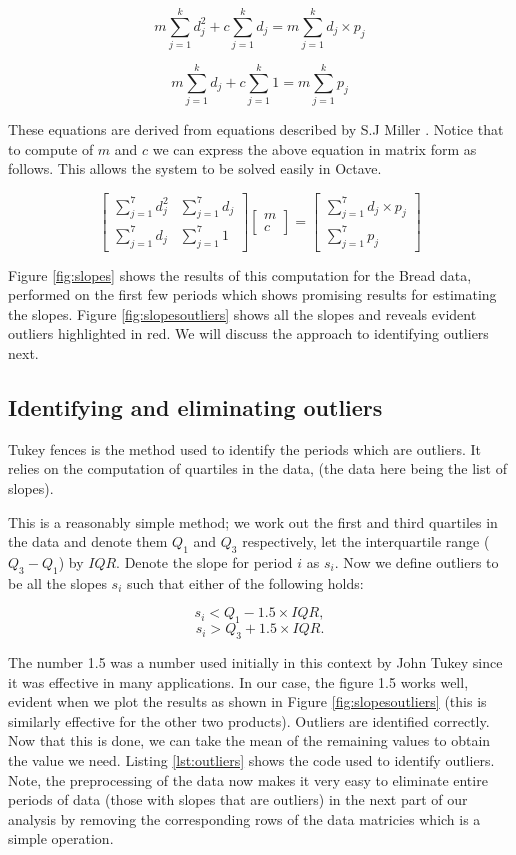 $$
m\sum_{j = 1}^{k} d_{j}^2 + c\sum_{j = 1}^{k} d_{j} = m\sum_{j = 1}^{k} d_{j} \times p_{j}
$$

$$
m\sum_{j = 1}^{k} d_{j} + c\sum_{j = 1}^{k} 1 = m\sum_{j = 1}^{k}  p_{j}
$$

These equations are derived from equations described by S.J Miller \cite{squares}. Notice that to compute of $m$ and $c$ we can express the above equation in matrix form as follows. This allows the system to be solved easily in Octave.

\[
\begin{bmatrix}
\sum_{j = 1}^{7} d_{j}^2 & \sum_{j = 1}^{7} d_{j} \\
\sum_{j = 1}^{7} d_{j} & \sum_{j = 1}^{7} 1
\end{bmatrix}
\begin{bmatrix}
m\\
c
\end{bmatrix}
=
\begin{bmatrix}
\sum_{j = 1}^{7} d_{j} \times p_{j}\\
\sum_{j = 1}^{7}  p_{j}
\end{bmatrix}
\]

Figure \ref{fig:slopes} shows the results of this computation for the Bread data, performed on the first few periods which shows promising results for estimating the slopes. Figure \ref{fig:slopesoutliers} shows all the slopes and reveals evident outliers highlighted in red. We will discuss the approach to identifying outliers next.

\subsection{Identifying and eliminating outliers}

Tukey fences \cite{tukey} is the method used to identify the periods which are outliers.  It relies on the computation of quartiles in the data, (the data here being the list of slopes).

This is a reasonably simple method; we work out the first and third quartiles in the data and denote them $Q_1$ and $Q_3$ respectively, let the interquartile range ($Q_3 - Q_1$) by $IQR$. Denote the slope for period $i$ as $s_i$. Now we define outliers to be all the slopes $s_i$ such that either of the following holds:

$$
s_i < Q_1 - 1.5 \times IQR,
$$
$$
s_i > Q_3 + 1.5 \times IQR .
$$

The number 1.5 was a number used initially in this context by John Tukey \cite{tukey2} since it was effective in many applications. In our case, the figure 1.5 works well, evident when we plot the results as shown in Figure \ref{fig:slopesoutliers} (this is similarly effective for the other two products). Outliers are identified correctly. Now that this is done, we can take the mean of the remaining values to obtain the value we need. Listing \ref{lst:outliers} shows the code used to identify outliers. Note, the preprocessing of the data now makes it very easy to eliminate entire periods of data (those with slopes that are outliers) in the next part of our analysis by removing the corresponding rows of the data matricies which is a simple operation.

